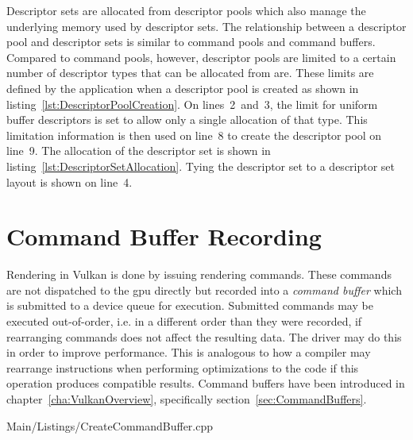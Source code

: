       Descriptor sets are allocated from descriptor pools which also manage the underlying memory used by descriptor sets.
      The relationship between a descriptor pool and descriptor sets is similar to command pools and command buffers.
      Compared to command pools, however, descriptor pools are limited to a certain number of descriptor types that can be allocated from are.
      These limits are defined by the application when a descriptor pool is created as shown in listing~\ref{lst:DescriptorPoolCreation}.
      On lines~2~and~3, the limit for uniform buffer descriptors is set to allow only a single allocation of that type.
      This limitation information is then used on line~8 to create the descriptor pool on line~9.
      The allocation of the descriptor set is shown in listing~\ref{lst:DescriptorSetAllocation}.
      Tying the descriptor set to a descriptor set layout is shown on line~4.



  \section{Command Buffer Recording}
  \label{sec:BuildCommandBuffers}
    Rendering in Vulkan is done by issuing rendering commands.
    These commands are not dispatched to the \gls{gpu} directly but recorded into a \textit{command buffer} which is submitted to a device queue for execution.
    Submitted commands may be executed out-of-order, i.e. in a different order than they were recorded, if rearranging commands does not affect the resulting data.
    The \gls{driver} may do this in order to improve performance.
    This is analogous to how a compiler may rearrange instructions when performing optimizations to the code if this operation produces compatible results.
    Command buffers have been introduced in chapter~\ref{cha:VulkanOverview}, specifically section~\ref{sec:CommandBuffers}.

    
    {Main/Listings/CreateCommandBuffer.cpp}

